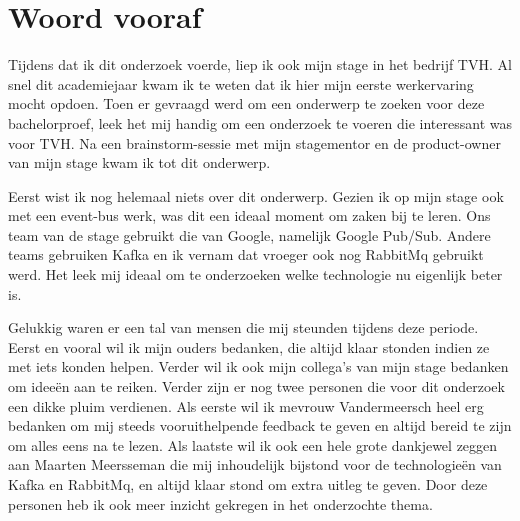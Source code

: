 
\chapter*{Woord vooraf}
\label{ch:voorwoord}


Tijdens dat ik dit onderzoek voerde, liep ik ook mijn stage in het bedrijf TVH. Al snel dit academiejaar kwam ik te weten dat ik hier mijn eerste werkervaring mocht opdoen. Toen er gevraagd werd om een onderwerp te zoeken voor deze bachelorproef, leek het mij handig om een onderzoek te voeren die interessant was voor TVH. Na een brainstorm-sessie met mijn stagementor en de product-owner van mijn stage kwam ik tot dit onderwerp. 

Eerst wist ik nog helemaal niets over dit onderwerp. Gezien ik op mijn stage ook met een event-bus werk, was dit een ideaal moment om zaken bij te leren. Ons team van de stage gebruikt die van Google, namelijk Google Pub/Sub. Andere teams gebruiken Kafka en ik vernam dat vroeger ook nog RabbitMq gebruikt werd. Het leek mij ideaal om te onderzoeken welke technologie nu eigenlijk beter is.

Gelukkig waren er een tal van mensen die mij steunden tijdens deze periode. Eerst en vooral wil ik mijn ouders bedanken, die altijd klaar stonden indien ze met iets konden helpen. Verder wil ik ook mijn collega's van mijn stage bedanken om ideeën aan te reiken. Verder zijn er nog twee personen die voor dit onderzoek een dikke pluim verdienen. Als eerste wil ik mevrouw Vandermeersch heel erg bedanken om mij steeds vooruithelpende feedback te geven en altijd bereid te zijn om alles eens na te lezen. Als laatste wil ik ook een hele grote dankjewel zeggen aan Maarten Meersseman die mij inhoudelijk bijstond voor de technologieën van Kafka en RabbitMq, en altijd klaar stond om extra uitleg te geven. Door deze personen heb ik ook meer inzicht gekregen in het onderzochte thema.